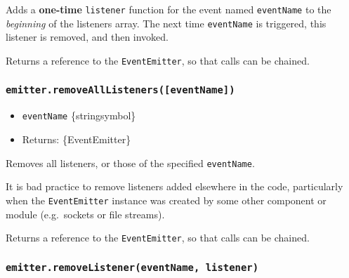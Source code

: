 Adds a \textbf{one-time} \texttt{listener} function for the event named
\texttt{eventName} to the \emph{beginning} of the listeners array. The
next time \texttt{eventName} is triggered, this listener is removed, and
then invoked.

\begin{Shaded}
\begin{Highlighting}[]
\NormalTok{(}\OperatorTok{,}\KeywordTok{=\textgreater{}}\NormalTok{ \{}
  \NormalTok{(}\NormalTok{)}\OperatorTok{;}
\NormalTok{\})}\OperatorTok{;}
\end{Highlighting}
\end{Shaded}

Returns a reference to the \texttt{EventEmitter}, so that calls can be
chained.

\subsubsection{\texorpdfstring{\texttt{emitter.removeAllListeners({[}eventName{]})}}{emitter.removeAllListeners({[}eventName{]})}}\label{emitter.removealllistenerseventname}

\begin{itemize}
\tightlist
\item
  \texttt{eventName} \{string\textbar symbol\}
\item
  Returns: \{EventEmitter\}
\end{itemize}

Removes all listeners, or those of the specified \texttt{eventName}.

It is bad practice to remove listeners added elsewhere in the code,
particularly when the \texttt{EventEmitter} instance was created by some
other component or module (e.g.~sockets or file streams).

Returns a reference to the \texttt{EventEmitter}, so that calls can be
chained.

\subsubsection{\texorpdfstring{\texttt{emitter.removeListener(eventName,\ listener)}}{emitter.removeListener(eventName, listener)}}\label{emitter.removelistenereventname-listener}


